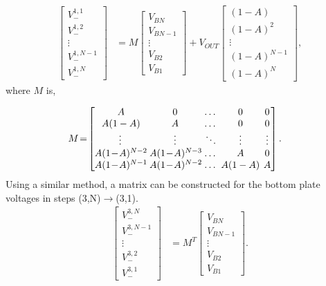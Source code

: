 \documentclass[conference]{IEEEtran}
\begin{document}
	\begin{equation}
	\begin{split}
	\begin{bmatrix}
	V_-^{1,1} \\
	V_-^{1,2} \\
	\vdots\\
	V_-^{1,N-1} \\ 
	V_-^{1,N}
	\end{bmatrix}
	&\!=\!
	M\!\begin{bmatrix}
	V_{BN} \\
	V_{BN-1} \\
	\vdots \\
	V_{B2} \\
	V_{B1}
	\end{bmatrix}\!+\!V_{OUT}\!\begin{bmatrix}
	(1-A) \\
	(1-A)^2 \\
	\vdots \\
	(1\!-\!A)^{N-1} \\
	(1\!-\!A)^N
	\end{bmatrix}\!,
	\end{split}
	\label{eq:V_1}
	\end{equation}
	where $M$ is,
	
	\begin{equation}
	\begin{split}
	M
	&\!=\!
	\arraycolsep2pt 
	\begin{bmatrix}
	A \!& 0 & \dots & 0 & 0 \\
	A(1-A) \!& A & \dots & 0 & 0\\
	\vdots & \vdots & \ddots & \vdots & \vdots \\
	A(1\!-\!A)^{N-2} \!& A(1\!-\!A)^{N-3} \!& \dots & A & 0\\ 
	A(1\!-\!A)^{N-1} \!& A(1\!-\!A)^{N-2} \!& \dots & A(1-A) & A 
	\end{bmatrix}.
	\end{split}
	\label{eq:M}
	\end{equation}
	Using a similar method, a matrix can be constructed for the bottom plate voltages in steps (3,N)$\rightarrow$(3,1).
	\begin{equation}
	\begin{split}
	\begin{bmatrix}
		V_-^{3,N} \\
		V_-^{3,N-1} \\
		\vdots\\
		V_-^{3,2} \\ 
		V_-^{3,1}
		\end{bmatrix}
		&\!=\!
		M^T\!\begin{bmatrix}
		V_{BN} \\
		V_{BN-1} \\
		\vdots \\
		V_{B2} \\
		V_{B1}
		\end{bmatrix}.
		\end{split}
		\label{eq:V_3}
		\end{equation}
	
\end{document}
